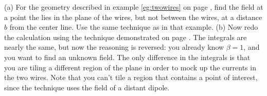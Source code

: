 (a) For the geometry described in example \ref{eg:twowires} on page \pageref{eg:twowires},
        find the field at a point the lies in the plane of the wires, but not between the wires,
        at a distance $b$ from the center line. 
        Use the same technique as in that example.\hwendpart
        (b) Now redo the calculation using the technique demonstrated on
        page \pageref{dipolestomakewire}. The integrals are nearly the same, but now the
        reasoning is reversed: you already know $\beta=1$, and you want to find an unknown
        field. The only difference in the integrals is that you are tiling a different
        region of the plane in order to mock up the currents in the two wires. Note that
        you can't tile a region that contains a point of interest, since the technique
        uses the field of a distant dipole.\answercheck

